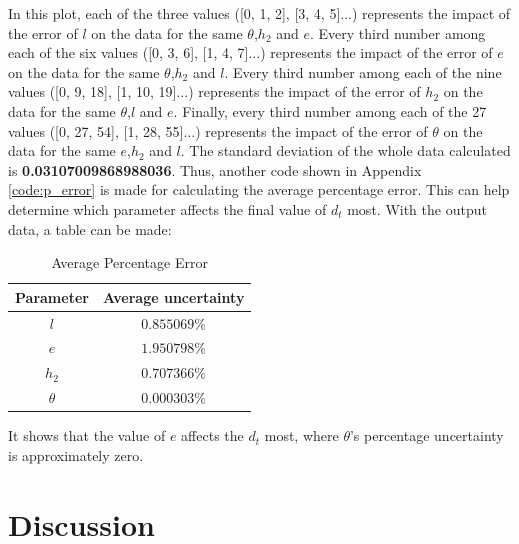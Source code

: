 \documentclass[conference]{IEEEtran}
\begin{document}
    In this plot, each of the three values ([0, 1, 2], [3, 4, 5]...) represents the impact of the error of $l$ on the data for the same $\theta$,$h_2$ and $e$. Every third number among each of the six values ([0, 3, 6], [1, 4, 7]...) represents the impact of the error of $e$ on the data for the same $\theta$,$h_2$ and $l$. Every third number among each of the nine values ([0, 9, 18], [1, 10, 19]...) represents the impact of the error of $h_2$ on the data for the same $\theta$,$l$ and $e$. Finally, every third number among each of the 27 values ([0, 27, 54], [1, 28, 55]...) represents the impact of the error of $\theta$ on the data for the same $e$,$h_2$ and $l$. The standard deviation of the whole data calculated is \textbf{0.03107009868988036}.\newline
    Thus, another code shown in Appendix \ref{code:p_error} is made for calculating the average percentage error. This can help determine which parameter affects the final value of $d_t$ most. With the output data, a table can be made:
    
    \begin{table}[H]
        \caption {Average Percentage Error} \label{tb:a_p_e} 
        \begin{center}
            \begin{tabular}{cc}
                \hline
                Parameter & Average uncertainty \\
                \hline
                $l$         & $0.855069\%$     \\
                $e$         & $1.950798\%$     \\
                $h_2$       & $0.707366\%$     \\
                $\theta$    & $0.000303\%$     \\
                \hline
            \end{tabular}
        \end{center}
    \end{table}
    It shows that the value of $e$ affects the $d_t$ most, where $\theta$'s percentage uncertainty is approximately zero. 
    
\section{Discussion}
\end{document}
